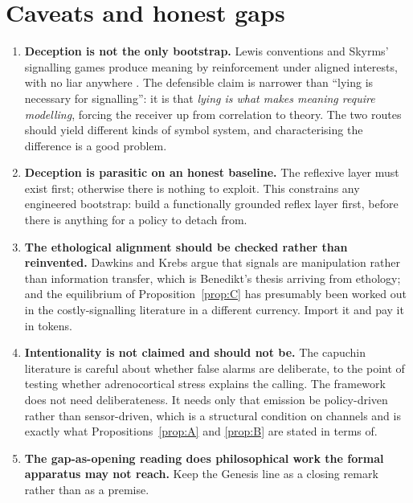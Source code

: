 \documentclass[11pt]{article}
\theoremstyle{plain}
\theoremstyle{definition}
\begin{document}
\section{Caveats and honest gaps}
\label{sec:caveats}

\begin{enumerate}
\item \textbf{Deception is not the only bootstrap.} Lewis conventions and Skyrms' signalling games
produce meaning by reinforcement under aligned interests, with no liar anywhere \cite{lewis,skyrms}. The
defensible claim is narrower than ``lying is necessary for signalling'': it is that \emph{lying is what
makes meaning require modelling}, forcing the receiver up from correlation to theory. The two routes
should yield different kinds of symbol system, and characterising the difference is a good problem.

\item \textbf{Deception is parasitic on an honest baseline.} The reflexive layer must exist first;
otherwise there is nothing to exploit. This constrains any engineered bootstrap: build a functionally
grounded reflex layer first, before there is anything for a policy to detach from.

\item \textbf{The ethological alignment should be checked rather than reinvented.} Dawkins and Krebs
\cite{dawkinskrebs} argue that signals are manipulation rather than information transfer, which is
Benedikt's thesis arriving from ethology; and the equilibrium of Proposition~\ref{prop:C} has
presumably been worked out in the costly-signalling literature \cite{msharper} in a different currency.
Import it and pay it in tokens.

\item \textbf{Intentionality is not claimed and should not be.} The capuchin literature is careful about
whether false alarms are deliberate, to the point of testing whether adrenocortical stress explains the
calling. The framework does not need deliberateness. It needs only that emission be policy-driven rather
than sensor-driven, which is a structural condition on channels and is exactly what
Propositions~\ref{prop:A} and \ref{prop:B} are stated in terms of.

\item \textbf{The gap-as-opening reading does philosophical work the formal apparatus may not reach.}
Keep the Genesis line as a closing remark rather than as a premise.
\end{enumerate}
\end{document}
